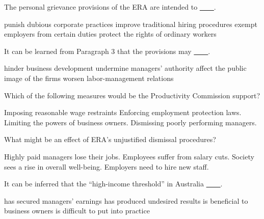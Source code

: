 \item The personal grievance provisions of the ERA are intended to \uline{~~~~}.
\begin{tasks}
	\task punish dubious corporate practices
	\task improve traditional hiring procedures
	\task exempt employers from certain duties
	\task protect the rights of ordinary workers
\end{tasks}
\item It can be learned from Paragraph 3 that the provisions may \uline{~~~~}.
\begin{tasks}
	\task hinder business development
	\task undermine managers' authority
	\task affect the public image of the firms
	\task worsen labor-management relations
\end{tasks}
\item Which of the following measures would be the Productivity Commission support?
\begin{tasks}
	\task Imposing reasonable wage restraints
	\task Enforcing employment protection laws.
	\task Limiting the powers of business owners.
	\task Dismissing poorly performing managers.
\end{tasks}
\item What might be an effect of ERA's unjustified dismissal procedures?
\begin{tasks}
	\task Highly paid managers lose their jobs.
	\task Employees suffer from salary cuts.
	\task Society sees a rise in overall well-being.
	\task Employers need to hire new staff.
\end{tasks}
\item It can be inferred that the ``high-income threshold'' in Australia \uline{~~~~}.
\begin{tasks}
	\task has secured managers' earnings
	\task has produced undesired results
	\task is beneficial to business owners
	\task is difficult to put into practice
\end{tasks}
